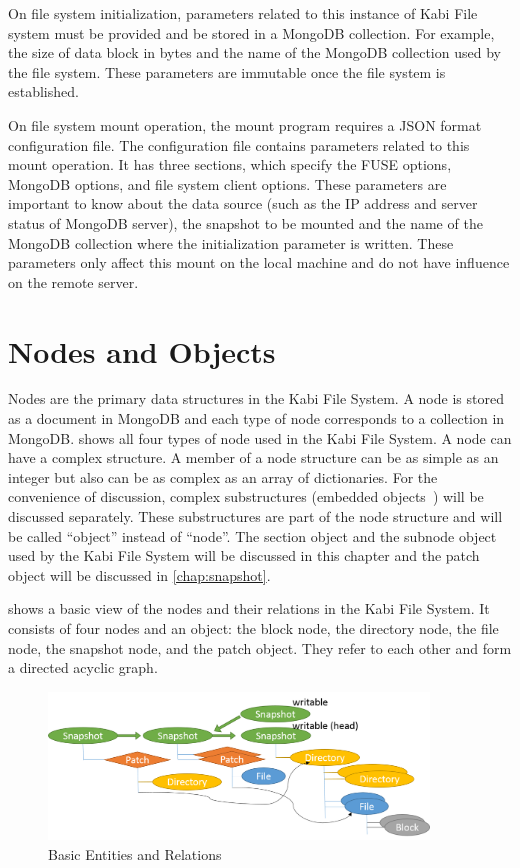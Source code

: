    On file system initialization, parameters related to this instance of Kabi File system must be provided and be stored in a MongoDB collection. For example, the size of data block in bytes and the name of the MongoDB collection used by the file system. These parameters are immutable once the file system is established.

    On file system mount operation, the mount program requires a JSON format configuration file. The configuration file contains parameters related to this mount operation. It has three sections, which specify the FUSE options, MongoDB options, and file system client options. These parameters are important to know about the data source (such as the IP address and server status of MongoDB server), the snapshot to be mounted and the name of the MongoDB collection where the initialization parameter is written. These parameters only affect this mount on the local machine and do not have influence on the remote server.

\section{Nodes and Objects}

    Nodes are the primary data structures in the Kabi File System. A node is stored as a document in MongoDB and each type of node corresponds to a collection in MongoDB.  shows all four types of node used in the Kabi File System. A node can have a complex structure. A member of a node structure can be as simple as an integer but also can be as complex as an array of dictionaries. For the convenience of discussion, complex substructures (embedded objects~\cite{bson}) will be discussed separately. These substructures are part of the node structure and will be called ``object'' instead of ``node''. The section object and the subnode object used by the Kabi File System will be discussed in this chapter and the patch object will be discussed in \cref{chap:snapshot}.

     shows a basic view of the nodes and their relations in the Kabi File System. It consists of four nodes and an object: the block node, the directory node, the file node, the snapshot node, and the patch object. They refer to each other and form a directed acyclic graph. 

\begin{figure}[t]
\centering
\includegraphics[width=0.9\textwidth]{Chapter-3/figs/fig2.png}
\caption{Basic Entities and Relations}
\label{fig:basic_entities}
\end{figure}

